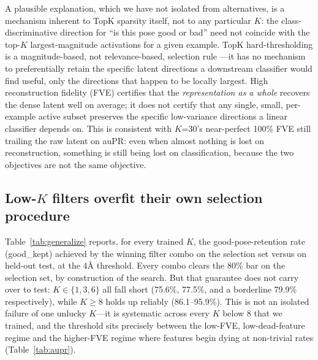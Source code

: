 \documentclass{article}
\begin{document}
A plausible explanation, which we have not isolated from alternatives, is a mechanism inherent to TopK sparsity itself, not to any particular $K$: the class-discriminative direction for ``is this pose good or bad'' need not coincide with the top-$K$ largest-magnitude activations for a given example. TopK hard-thresholding is a magnitude-based, not relevance-based, selection rule \citep{gao2024}---it has no mechanism to preferentially retain the specific latent directions a downstream classifier would find useful, only the directions that happen to be locally largest. High reconstruction fidelity (FVE) certifies that the \emph{representation as a whole} recovers the dense latent well on average; it does not certify that any single, small, per-example active subset preserves the specific low-variance directions a linear classifier depends on. This is consistent with $K$=30's near-perfect 100\% FVE still trailing the raw latent on auPR: even when almost nothing is lost on reconstruction, something is still being lost on classification, because the two objectives are not the same objective.

\subsection{Low-$K$ filters overfit their own selection procedure}
\label{sec:generalize}

Table~\ref{tab:generalize} reports, for every trained $K$, the good-pose-retention rate (good\_kept) achieved by the winning filter combo on the selection set versus on held-out test, at the 4\r{A} threshold. Every combo clears the 80\% bar on the selection set, by construction of the search. But that guarantee does not carry over to test: $K\in\{1,3,6\}$ all fall short (75.6\%, 77.5\%, and a borderline 79.9\% respectively), while $K\ge8$ holds up reliably (86.1--95.9\%). This is not an isolated failure of one unlucky $K$---it is systematic across every $K$ below 8 that we trained, and the threshold sits precisely between the low-FVE, low-dead-feature regime and the higher-FVE regime where features begin dying at non-trivial rates (Table~\ref{tab:aupr}).
\end{document}
